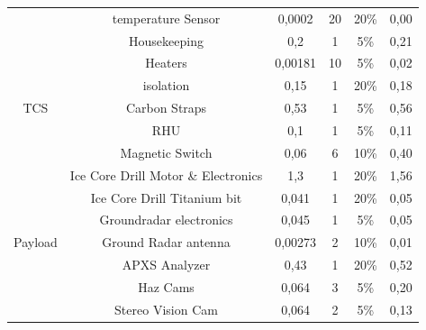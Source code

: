 \begin{table}[]
{\begin{tabular}{cccccc}
                                         & temperature Sensor                  & 0,0002                      & 20       & 20\%             & 0,00           \\
                                         & Housekeeping                        & 0,2                         & 1        & 5\%              & 0,21           \\
\multirow{5}{*}{TCS}                     & Heaters                             & 0,00181                     & 10       & 5\%              & 0,02           \\
                                         & isolation                           & 0,15                        & 1        & 20\%             & 0,18           \\
                                         & Carbon Straps                       & 0,53                        & 1        & 5\%              & 0,56           \\
                                         & RHU                                 & 0,1                         & 1        & 5\%              & 0,11           \\
                                         & Magnetic Switch                     & 0,06                        & 6        & 10\%             & 0,40           \\
\multirow{10}{*}{Payload}                & Ice Core Drill Motor \& Electronics & 1,3                         & 1        & 20\%             & 1,56           \\
                                         & Ice Core Drill Titanium bit         & 0,041                       & 1        & 20\%             & 0,05           \\
                                         & Groundradar electronics             & 0,045                       & 1        & 5\%              & 0,05           \\
                                         & Ground Radar antenna                & 0,00273                     & 2        & 10\%             & 0,01           \\
                                         & APXS Analyzer                       & 0,43                        & 1        & 20\%             & 0,52           \\
                                         & Haz Cams                            & 0,064                       & 3        & 5\%              & 0,20           \\
                                         & Stereo Vision Cam                   & 0,064                       & 2        & 5\%              & 0,13           \\

\end{tabular}}
\end{table}
